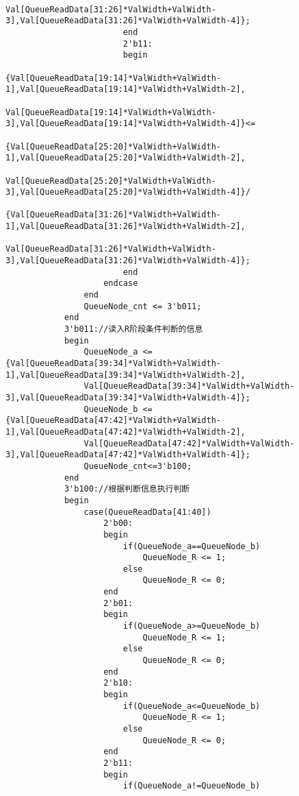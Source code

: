 \documentclass[lang=cn,11pt,a4paper]{elegantpaper}
\begin{document}
\begin{lstlisting}
                            Val[QueueReadData[31:26]*ValWidth+ValWidth-3],Val[QueueReadData[31:26]*ValWidth+ValWidth-4]};
                        end
                        2'b11:
                        begin
                            {Val[QueueReadData[19:14]*ValWidth+ValWidth-1],Val[QueueReadData[19:14]*ValWidth+ValWidth-2],
                            Val[QueueReadData[19:14]*ValWidth+ValWidth-3],Val[QueueReadData[19:14]*ValWidth+ValWidth-4]}<=
                            {Val[QueueReadData[25:20]*ValWidth+ValWidth-1],Val[QueueReadData[25:20]*ValWidth+ValWidth-2],
                            Val[QueueReadData[25:20]*ValWidth+ValWidth-3],Val[QueueReadData[25:20]*ValWidth+ValWidth-4]}/
                            {Val[QueueReadData[31:26]*ValWidth+ValWidth-1],Val[QueueReadData[31:26]*ValWidth+ValWidth-2],
                            Val[QueueReadData[31:26]*ValWidth+ValWidth-3],Val[QueueReadData[31:26]*ValWidth+ValWidth-4]};
                        end
                    endcase
                end
                QueueNode_cnt <= 3'b011;
            end
            3'b011://读入R阶段条件判断的信息
            begin
                QueueNode_a <= {Val[QueueReadData[39:34]*ValWidth+ValWidth-1],Val[QueueReadData[39:34]*ValWidth+ValWidth-2],
                Val[QueueReadData[39:34]*ValWidth+ValWidth-3],Val[QueueReadData[39:34]*ValWidth+ValWidth-4]};
                QueueNode_b <= {Val[QueueReadData[47:42]*ValWidth+ValWidth-1],Val[QueueReadData[47:42]*ValWidth+ValWidth-2],
                Val[QueueReadData[47:42]*ValWidth+ValWidth-3],Val[QueueReadData[47:42]*ValWidth+ValWidth-4]};
                QueueNode_cnt<=3'b100;
            end
            3'b100://根据判断信息执行判断
            begin
                case(QueueReadData[41:40])
                    2'b00:
                    begin
                        if(QueueNode_a==QueueNode_b)
                            QueueNode_R <= 1;
                        else
                            QueueNode_R <= 0;
                    end
                    2'b01:
                    begin
                        if(QueueNode_a>=QueueNode_b)
                            QueueNode_R <= 1;
                        else
                            QueueNode_R <= 0;
                    end
                    2'b10:
                    begin
                        if(QueueNode_a<=QueueNode_b)
                            QueueNode_R <= 1;
                        else
                            QueueNode_R <= 0;
                    end
                    2'b11:
                    begin
                        if(QueueNode_a!=QueueNode_b)

\end{lstlisting}
\end{document}
